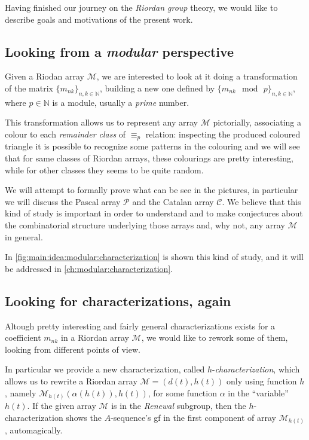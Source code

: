 
Having finished our journey on the \emph{Riordan group} theory, we would like
to describe goals and motivations of the present work.

\subsection{Looking from a \emph{modular} perspective}

Given a Riodan array $\mathcal{M}$, we are interested to look at it
doing a transformation of the matrix $\lbrace m_{nk}\rbrace_{n,k\in\mathbb{N}}$,
building a new one defined by $\lbrace m_{nk}\mod\,p\rbrace_{n,k\in\mathbb{N}}$,
where $p\in\mathbb{N}$ is a module, usually a \emph{prime} number.

This transformation allows us to represent any array $\mathcal{M}$ pictorially,
associating a colour to each \emph{remainder class} of $\equiv_{p}$ relation:
inspecting the produced coloured triangle it is possible to recognize some
patterns in the colouring and we will see that for same classes of Riordan
arrays, these colourings are pretty interesting, while for other classes they
seems to be quite random.

We will attempt to formally prove what can be see in the pictures, in
particular we will discuss the Pascal array $\mathcal{P}$ and the Catalan array
$\mathcal{C}$.  We believe that this kind of study is important in order to
understand and to make conjectures about the combinatorial structure underlying
those arrays and, why not, any array $\mathcal{M}$ in general.



In \autoref{fig:main:idea:modular:characterization} is shown this kind of study,
and it will be addressed in \autoref{ch:modular:characterization}.

\subsection{Looking for characterizations, again}

Altough pretty interesting and fairly general characterizations exists for
a coefficient $m_{nk}$ in a Riordan array $\mathcal{M}$, we would like to
rework some of them, looking from different points of view.

In particular we provide a new characterization, called $h$-\emph{characterization},
which allows us to rewrite a Riordan array $\mathcal{M}=(d(t),h(t))$ only
using function $h$, namely $\mathcal{M}_{h(t)}(\alpha(h(t)),h(t))$, for some
function $\alpha$ in the ``variable'' $h(t)$. If the given array $\mathcal{M}$
is in the \emph{Renewal} subgroup, then the $h$-characterization shows the $A$-sequence's
\ac{gf} in the first component of array $\mathcal{M}_{h(t)}$, automagically.

